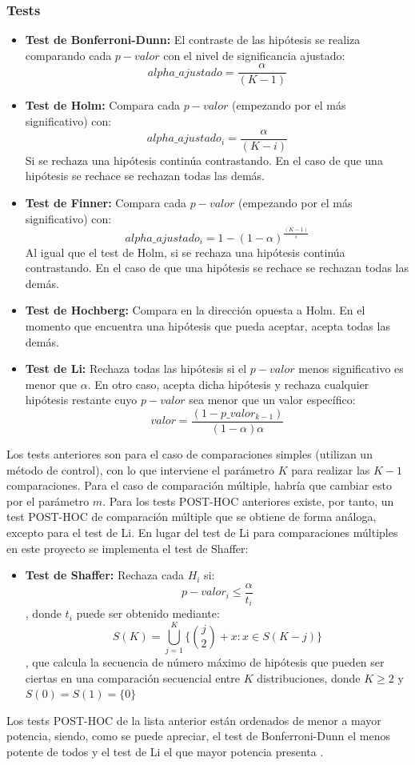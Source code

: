 \subsubsection{Tests}
\begin{itemize}
\item \textbf{Test de Bonferroni-Dunn:} El contraste de las hipótesis se realiza comparando cada $p-valor$ con
el nivel de significancia ajustado:
\[ alpha\_ajustado = \frac{\alpha}{(K-1)} \]
\item \textbf{Test de Holm:} Compara cada $p-valor$ (empezando por el más significativo) con:
\[ alpha\_ajustado_i = \frac{\alpha}{(K-i)} \]
Si se rechaza una hipótesis continúa contrastando. En el caso de que una hipótesis se rechace se rechazan todas
las demás.
\item \textbf{Test de Finner:} Compara cada $p-valor$ (empezando por el más significativo) con:
\[ alpha\_ajustado_i = 1-(1-\alpha)^{\frac{(K-1)}{i}} \]
Al igual que el test de Holm, si se rechaza una hipótesis continúa contrastando. En el caso de que una hipótesis
se rechace se rechazan todas
las demás.
\item \textbf{Test de Hochberg:} Compara en la dirección opuesta a Holm. En el momento que encuentra una hipótesis
que pueda aceptar, acepta todas las demás.
\item \textbf{Test de Li:} Rechaza todas las hipótesis si el $p-valor$ menos significativo es menor que  $\alpha$.
En otro caso, acepta dicha hipótesis y rechaza cualquier hipótesis restante cuyo $p-valor$ sea menor que un valor
específico:
\[ valor = \frac{(1-p\_valor_{k-1})}{(1-\alpha)\alpha} \]
\end{itemize}

Los tests anteriores son para el caso de comparaciones simples (utilizan un método de control), con lo que
interviene el parámetro $K$ para realizar las $K-1$ comparaciones. Para el caso de comparación múltiple, habría
que cambiar esto por el parámetro $m$. Para los tests POST-HOC anteriores existe, por tanto, un test POST-HOC
de comparación múltiple que se obtiene de forma análoga, excepto para el test de Li. En lugar del test de Li
para comparaciones múltiples en este proyecto se implementa el test de Shaffer:

\begin{itemize}
\item \textbf{Test de Shaffer:} Rechaza cada $H_i$ si:
\[ p-valor_{i} \leq \frac{\alpha}{t_i} \]
, donde $t_i$ puede ser obtenido mediante:
\[ S(K) = \bigcup_{j=1}^{K} \{{j \choose 2}  + x: x \in S(K-j)\} \]
, que calcula la secuencia de número máximo de hipótesis que pueden ser ciertas en una comparación secuencial
entre $K$ distribuciones, donde $K \geq 2$ y $S(0) = S(1) = \{0\}$
\end{itemize}

Los tests POST-HOC de la lista anterior están ordenados de menor a mayor potencia, siendo, como se puede apreciar,
el test de Bonferroni-Dunn el menos potente de todos y el test de Li el que mayor potencia presenta \cite{potencia}.



